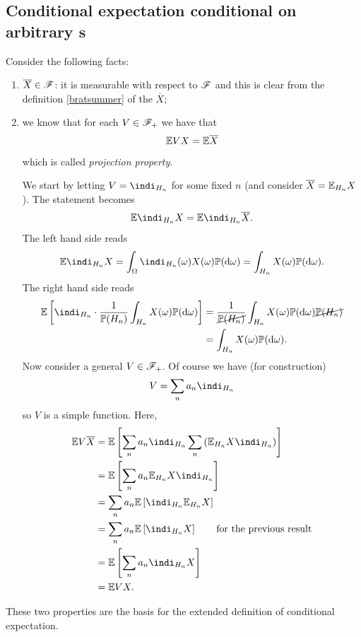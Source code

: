 \documentclass{report}
\begin{document}
 \subsection{Conditional expectation conditional on arbitrary \sa{}s}
Consider the following facts:
\begin{enumerate}
	\item $\overline{X}\in\mathscr{F}$: it is measurable with respect to $\mathscr{F}$ and this is clear from the definition \ref{bratsummer} of the \rv{} $\overline{X}$;
	\item we know that for each $V\in\mathscr{F}_{+}$ we have that
	\[\mathbb{E} VX=\mathbb{E}\overline{X}\]
	which is called \emph{projection property}.
	\begin{fancyproof}
		We start by letting $V=\indi_{H_n}$ for some fixed $n$ (and consider $\overline{X}=\mathbb{E}_{H_{n}}X$). The statement becomes 
		\[\ev\indi_{H_{n}}X=\ev\indi_{H_{n}}\xbar.\]
		The left hand side reads
		\[\ev\indi_{H_{n}}X=\int_{\Omega}\indi_{H_{n}}(\omega)X(\omega)\pr(\dw)=\int_{H_{n}}X(\omega)\pr(\dw).\]
		The right hand side reads
		\begin{align*}
			\ev\left[\indi_{H_n}\cdot\frac{1}{\pr(H_{n})}\int_{H_{n}}X(\omega)\pr(\dw)\right]&=\frac{1}{\cancel{\pr(H_{n})}}\int_{H_{n}}X(\omega)\pr(\dw)\cancel{\pr(H_{n})}\\
			&=\int_{H_n}X(\omega)\pr(\dw).
		\end{align*}
		Now consider a general \rv{} $V\in\mathscr{F}_{+}$. Of course we have (for construction) 
		\[V=\sum_n a_{n}\indi_{H_n}\]
		so $V$ is a simple function. Here,
		\begin{align*}
			\ev V\xbar&=\ev\left[\sum_n a_{n}\indi_{H_n}\sum_n\left(\ev_{H_{n}}X\indi_{H_n}\right)\right]\\
			&=\ev\left[\sum_n a_{n}\ev_{H_{n}}X\indi_{H_n}\right]\\
			&=\sum_n a_{n}\ev\left[\indi_{H_n}\ev_{H_{n}}X\right]\\
			&=\sum_n a_{n}\ev\left[\indi_{H_{n}}X\right]\qquad\text{for the previous result}\\
			&=\ev\left[\sum_n a_n\indi_{H_n}X\right]\\
			&=\ev VX.
		\end{align*}
	\end{fancyproof}
\end{enumerate}
These two properties are the basis for the extended definition of conditional expectation.
\end{document}

